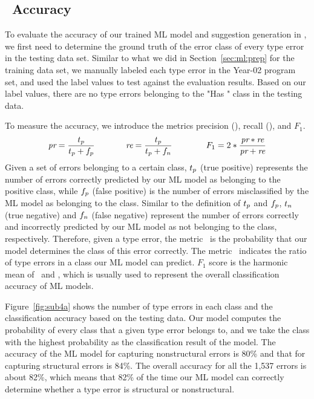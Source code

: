 \documentclass[12pt]{report}	%
\begin{document}
\subsection{\newCompiler\ Accuracy}
\label{sec:eval:model-accuracy}

To evaluate the accuracy of our trained ML model and 
suggestion generation in \newCompiler,
we first need to determine the ground truth of the error class 
of every type error in
the testing data set. Similar to what we did in Section~\ref{sec:ml:prep}
for the training data set, we manually labeled each type error in the Year-02
program set, and used the label values to test against the evaluation results.
Based on our label values,
there are no type errors belonging to the "Has \prog{\$}" class in the testing data.

To measure the accuracy,
we introduce the metrics precision (\pr),
recall (\re), and $F_1$.
\begin{equation*}
\pr = \frac{\tp}{\tp+\fp}\ \ \ \ \ \ \ \  \ \ \
\re = \frac{\tp}{\tp+\fn}\ \ \ \ \ \ \ \ \ \ \ \
F_1 = 2 * \frac{\pr*\re}{\pr+\re}
\end{equation*}
%
Given a set of errors belonging to a certain class,
$t_p$ (true positive) represents the number of errors correctly predicted by our ML model
as belonging to the positive class, while
$f_p$ (false positive) is the number of errors misclassified by the ML model as belonging to the class.
Similar to the definition of $t_p$ and $f_p$,
$t_n$ (true negative) and $f_n$ (false negative) represent the number of errors
correctly and incorrectly predicted
by our ML model as not belonging to the class, respectively.
Therefore, given a type error,
the metric \pr\ is the probability that
our model determines the class of this error correctly.
The metric \re\ indicates the ratio of type errors in a class
our ML model can predict.
$F_1$ score is the harmonic mean of \pr\ and \re,
which is usually used to represent the overall classification
accuracy of ML models.


Figure~\ref{fig:sub4a} shows the number of type errors
in each class and the classification accuracy based on the testing data.
Our model computes the probability of every class that a given
type error belongs to, and we take the class with the highest
probability as the classification result of the model.
%
The accuracy of the ML model for capturing nonstructural 
errors is 80\% and that for capturing 
structural 
errors is 84\%.
%
The overall accuracy for all the 1,537 errors is about 82\%,
which means that 82\% of the time our ML model can correctly
determine whether a type error is structural or nonstructural.
\end{document}
